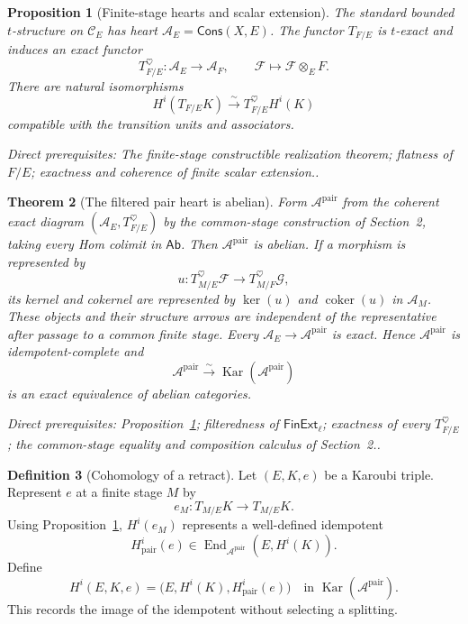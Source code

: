 \documentclass[10pt]{article}
\newtheorem{theorem}{Theorem}[section]
\newtheorem{proposition}[theorem]{Proposition}
\theoremstyle{definition}
\newtheorem{definition}[theorem]{Definition}
\newcommand{\End}{\operatorname{End}}
\newcommand{\Kar}{\operatorname{Kar}}
\newcommand{\Cons}{\mathsf{Cons}}
\newcommand{\depends}[1]{\par\smallskip\noindent\textit{Direct prerequisites:} #1.}
\begin{document}
\begin{proposition}[Finite-stage hearts and scalar extension]
\label{prop:finite-hearts}
The standard bounded $t$-structure on $\mathcal C_E$ has heart
$\mathcal A_E=\Cons(X,E)$.  The functor $T_{F/E}$ is $t$-exact and induces
an exact functor
\[
 T^{\heartsuit}_{F/E}:\mathcal A_E\longrightarrow\mathcal A_F,
 \qquad \mathcal F\longmapsto\mathcal F\otimes_EF.
\]
There are natural isomorphisms
\[
 H^i(T_{F/E}K)\xrightarrow{\sim}
 T^{\heartsuit}_{F/E}H^i(K)
\]
compatible with the transition units and associators.
\depends{The finite-stage constructible realization theorem; flatness of
$F/E$; exactness and coherence of finite scalar extension.}
\end{proposition}

\begin{theorem}[The filtered pair heart is abelian]\label{thm:pair-heart}
Form $\mathcal A^{\mathrm{pair}}$ from the coherent exact diagram
$(\mathcal A_E,T^{\heartsuit}_{F/E})$ by the common-stage construction of
Section~2, taking every Hom colimit in $\mathsf{Ab}$.  Then
$\mathcal A^{\mathrm{pair}}$ is abelian.  If a morphism is represented by
\[
 u:T^{\heartsuit}_{M/E}\mathcal F\longrightarrow
 T^{\heartsuit}_{M/F}\mathcal G,
\]
its kernel and cokernel are represented by $\ker(u)$ and
$\operatorname{coker}(u)$ in $\mathcal A_M$.  These objects and their
structure arrows are independent of the representative after passage to a
common finite stage.  Every $\mathcal A_E\to\mathcal A^{\mathrm{pair}}$ is
exact.  Hence $\mathcal A^{\mathrm{pair}}$ is idempotent-complete and
\[
 \mathcal A^{\mathrm{pair}}\xrightarrow{\sim}
 \Kar(\mathcal A^{\mathrm{pair}})
\]
is an exact equivalence of abelian categories.
\depends{Proposition~\ref{prop:finite-hearts}; filteredness of
$\mathsf{FinExt}_\ell$; exactness of every $T^{\heartsuit}_{F/E}$; the
common-stage equality and composition calculus of Section~2.}
\end{theorem}

\begin{definition}[Cohomology of a retract]\label{def:retract-cohomology}
Let $(E,K,e)$ be a Karoubi triple.  Represent $e$ at a finite stage $M$ by
\[
 e_M:T_{M/E}K\longrightarrow T_{M/E}K.
\]
Using Proposition~\ref{prop:finite-hearts}, $H^i(e_M)$ represents a
well-defined idempotent
\[
 H^i_{\mathrm{pair}}(e)\in
 \End_{\mathcal A^{\mathrm{pair}}}(E,H^i(K)).
\]
Define
\[
 H^i(E,K,e)=\bigl(E,H^i(K),H^i_{\mathrm{pair}}(e)\bigr)
 \quad\text{in }\Kar(\mathcal A^{\mathrm{pair}}).
\]
This records the image of the idempotent without selecting a splitting.
\end{definition}
\end{document}

